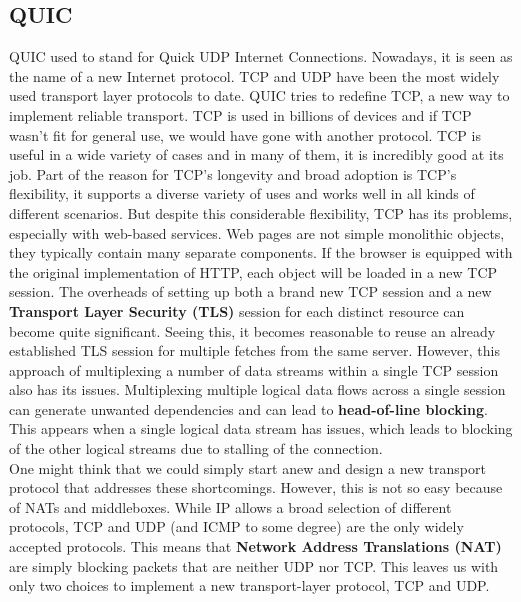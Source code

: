 \subsection{QUIC}
QUIC used to stand for Quick UDP Internet Connections. Nowadays, it is seen as the name of a new Internet protocol. TCP and UDP have been the most widely used transport layer protocols to date. QUIC tries to redefine TCP, a new way to implement reliable transport. TCP is used in billions of devices and if TCP wasn't fit for general use, we would have gone with another protocol. TCP is useful in a wide variety of cases and in many of them, it is incredibly good at its job. Part of the reason for TCP's longevity and broad adoption is TCP's flexibility, it supports a diverse variety of uses and works well in all kinds of different scenarios. But despite this considerable flexibility, TCP has its problems, especially with web-based services. Web pages are not simple monolithic objects, they typically contain many separate components. If the browser is equipped with the original implementation of HTTP, each object will be loaded in a new TCP session. The overheads of setting up both a brand new TCP session and a new \textbf{Transport Layer Security (TLS)} session for each distinct resource can become quite significant. Seeing this, it becomes reasonable to reuse an already established TLS session for multiple fetches from the same server. However, this approach of multiplexing a number of data streams within a single TCP session also has its issues. Multiplexing multiple logical data flows across a single session can generate unwanted dependencies and can lead to \textbf{head-of-line blocking}. This appears when a single logical data stream has issues, which leads to blocking of the other logical streams due to stalling of the connection. \vspace{.3cm}\\

One might think that we could simply start anew and design a new transport protocol that addresses these shortcomings. However, this is not so easy because of NATs and middleboxes. While IP allows a broad selection of different protocols, TCP and UDP (and ICMP to some degree) are the only widely accepted protocols. This means that \textbf{Network Address Translations (NAT)} are simply blocking packets that are neither UDP nor TCP. This leaves us with only two choices to implement a new transport-layer protocol, TCP and UDP.\vspace{.3cm}\\

